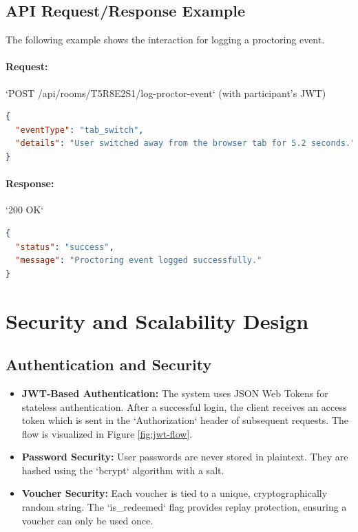 \subsection{API Request/Response Example}
The following example shows the interaction for logging a proctoring event.

\paragraph{Request:} `POST /api/rooms/T5R8E2S1/log-proctor-event` (with participant's JWT)
\begin{lstlisting}[language=JSON]
{
  "eventType": "tab_switch",
  "details": "User switched away from the browser tab for 5.2 seconds."
}
\end{lstlisting}

\paragraph{Response:} `200 OK`
\begin{lstlisting}[language=JSON]
{
  "status": "success",
  "message": "Proctoring event logged successfully."
}
\end{lstlisting}

\section{Security and Scalability Design}
\label{sec:arch-security-scalability}

\subsection{Authentication and Security}
\begin{itemize}
    \item \textbf{JWT-Based Authentication:} The system uses JSON Web Tokens for stateless authentication. After a successful login, the client receives an access token which is sent in the `Authorization` header of subsequent requests. The flow is visualized in Figure \ref{fig:jwt-flow}.
    \item \textbf{Password Security:} User passwords are never stored in plaintext. They are hashed using the `bcrypt` algorithm with a salt.
    \item \textbf{Voucher Security:} Each voucher is tied to a unique, cryptographically random string. The `is_redeemed` flag provides replay protection, ensuring a voucher can only be used once.
\end{itemize}

